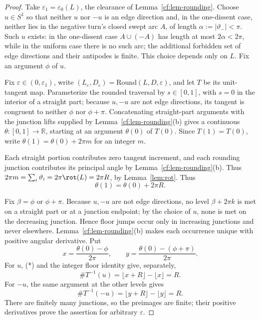 \begin{proof}
Take $\varepsilon_1=\varepsilon_0(L)$, the clearance of Lemma~\ref{cf:lem-rounding}.
Choose $u\in S^1$ so that neither $u$ nor $-u$ is an edge direction and, in the
one-dissent case, neither lies in the negative turn's closed swept arc $A$, of
length $\alpha:=|\vartheta_-|<\pi$. Such $u$ exists: in the one-dissent case $A\cup(-A)$
has length at most $2\alpha<2\pi$, while in the uniform case there is no such arc; the additional
forbidden set of edge directions and their antipodes is finite. This choice depends only on $L$. Fix an argument $\phi$ of $u$.

Fix $\varepsilon\in(0,\varepsilon_1)$, write
$(L_\varepsilon,D_\varepsilon)=\mathrm{Round}(L,D,\varepsilon)$, and let $T$ be
its unit-tangent map. Parameterize the rounded traversal by $s\in[0,1]$, with
$s=0$ in the interior of a straight part; because $u,-u$ are not edge directions, its tangent
is congruent to neither $\phi$ nor $\phi+\pi$. Concatenating straight-part arguments
with the junction lifts supplied by Lemma~\ref{cf:lem-rounding}(b) gives a continuous
$\theta\colon[0,1]\to\mathbb R$, starting at an argument $\theta(0)$ of $T(0)$.
Since $T(1)=T(0)$, write $\theta(1)=\theta(0)+2\pi m$ for an integer $m$.

Each straight portion contributes zero tangent increment, and each
rounding junction contributes its principal angle by
Lemma~\ref{cf:lem-rounding}(b). Thus
$2\pi m=\sum_i\vartheta_i=2\pi\rot(L)=2\pi R$, by
Lemma~\ref{lem:rot}.
Thus
\[
 \theta(1)=\theta(0)+2\pi R.                                  \tag{*}
\]

Fix $\beta=\phi$ or $\phi+\pi$. Because $u,-u$ are not edge directions, no
level $\beta+2\pi k$ is met on a straight part or at a junction endpoint; by
the choice of $u$, none is met on the decreasing junction. Hence floor jumps
occur only in increasing junctions and never elsewhere. Lemma~\ref{cf:lem-rounding}(b)
makes each occurrence unique with positive angular derivative. Put
\[
 x=\frac{\theta(0)-\phi}{2\pi},\qquad
 y=\frac{\theta(0)-(\phi+\pi)}{2\pi}.
\]
For $u$, (*) and the integer floor identity give, separately,
\[
 \#T^{-1}(u)=\lfloor x+R\rfloor-\lfloor x\rfloor=R.
\]
For $-u$, the same argument at the other levels gives
\[
 \#T^{-1}(-u)=\lfloor y+R\rfloor-\lfloor y\rfloor=R.
\]
There are finitely many junctions, so the preimages are finite; their positive derivatives prove the assertion for arbitrary $\varepsilon$.


\end{proof}
